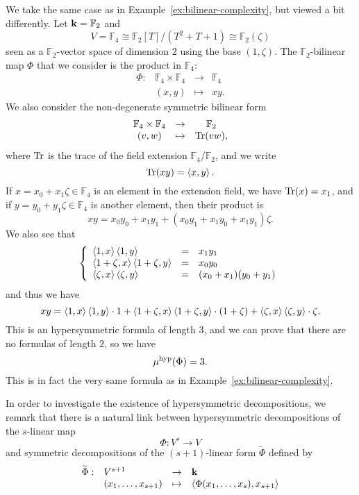 \begin{ex}
  \label{ex:trisymmetric-formula}
  We take the same case as in Example~\ref{ex:bilinear-complexity}, but viewed
  a bit differently. Let $\mathbf{k}=\mathbb{F}_2$ and 
  \[
    V=\mathbb{F}_4\cong\mathbb{F}_2[T]/(T^2+T+1)\cong\mathbb{F}_2(\zeta)
  \]
  seen as a $\mathbb{F}_2$-vector space of dimension $2$ using the base $(1,
  \zeta)$. The $\mathbb{F}_2$-bilinear map $\Phi$ that we
  consider is the product in $\mathbb{F}_4$:
  \[
 \begin{array}{cccc}
   \Phi: & \mathbb{F}_4\times \mathbb{F}_4 &\to&\mathbb{F}_4\\
 &(x,y)&\mapsto&xy.
 \end{array}
  \]
  We also consider the non-degenerate symmetric bilinear form
\[
 \begin{array}{ccc}
   \mathbb{F}_4\times \mathbb{F}_4 &\to&\mathbb{F}_2\\
 (v,w)&\mapsto&\operatorname{Tr}(vw),
 \end{array}
\]
where $\operatorname{Tr}$ is the trace of the field extension $\mathbb{F}_4/\mathbb{F}_2$,
and we write
\[
  \operatorname{Tr}(xy) = \left\langle x,y\right\rangle.
\]
If $x = x_0 + x_1\zeta\in\mathbb{F}_4$ is an element in the extension field, we have $\operatorname{Tr}(x) = x_1$, and if $y = y_0
+ y_1\zeta\in\mathbb{F}_4$ is another element, then their product is
\[
  xy = x_0y_0 + x_1y_1 + (x_0y_1 + x_1y_0 + x_1y_1)\zeta.
\]
We also see that
\[
\left\{ 
  \begin{array}{lll}
    \left\langle1,x\right\rangle\left\langle1,y\right\rangle &=& x_1y_1 \\
    \left\langle1+\zeta,x\right\rangle\left\langle1+\zeta,y\right\rangle &=& x_0y_0 \\
    \left\langle\zeta,x\right\rangle\left\langle\zeta,y\right\rangle &=& (x_0+x_1)(y_0+y_1)
  \end{array}
\right.
\]
and thus we have
\[
  xy =
  \left\langle1,x\right\rangle\left\langle1,y\right\rangle\cdot1+\left\langle1+\zeta,x\right\rangle\left\langle1+\zeta,y\right\rangle\cdot(1+\zeta)+\left\langle\zeta,x\right\rangle\left\langle\zeta,y\right\rangle\cdot\zeta.
\]
This is an hypersymmetric formula of length $3$, and we can prove that there are
no formulas of length $2$, so we have
\[
  \mu^{\textrm{hyp}}(\Phi) = 3.
\]
This is in fact the very same formula as in
Example~\ref{ex:bilinear-complexity}.
\end{ex}
In order to investigate the existence of hypersymmetric decompositions, we
remark that there is a natural link between hypersymmetric decompositions of 
the $s$-linear map
\[
  \Phi:V^s\to V
\]
and symmetric decompositions of the $(s+1)$-linear form $\widetilde\Phi$ defined by
\[
  \begin{array}{llll}
    \widetilde\Phi:&V^{s+1}&\to&\mathbf{k}\\
    &(x_1, \dots, x_{s+1})&\mapsto&\left\langle\Phi(x_1, \dots, x_s),x_{s+1}\right\rangle
  \end{array}
\]

